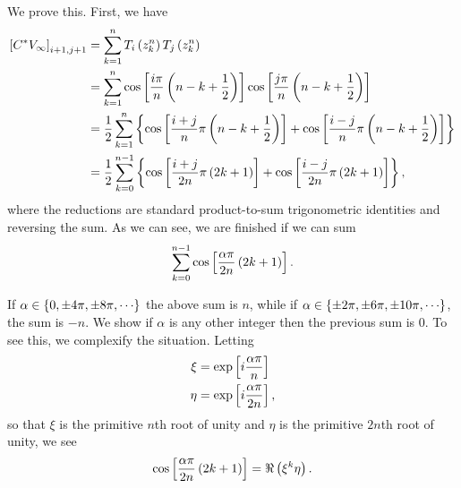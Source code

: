 We prove this.
First, we have
%
\begin{align}
    \left[ C^{*}V_{\infty} \right]_{i+1,j+1}
        &= \sum_{k=1}^{n} T_{i}\left( z_{k}^{n} \right)
        T_{j}\left( z_{k}^{n} \right) \nonumber\\
     &= \sum_{k=1}^{n}
        \cos\left[ \frac{i\pi}{n}\left( n - k + \frac{1}{2} \right) \right]
        \cos\left[ \frac{j\pi}{n}\left( n - k + \frac{1}{2} \right) \right]
        \nonumber \\
     &= \frac{1}{2}\sum_{k=1}^{n}\left\{ 
            \cos\left[ \frac{i + j}{n}\pi\left( n - k + \frac{1}{2} \right) \right]
            + \cos\left[ \frac{i - j}{n}\pi\left( n - k + \frac{1}{2} \right) \right]
         \right\} \nonumber \\
     &= \frac{1}{2}\sum_{k=0}^{n-1}\left\{ 
            \cos\left[ \frac{i + j}{2n}\pi\left( 2k + 1 \right) \right]
            + \cos\left[ \frac{i - j}{2n}\pi\left( 2k + 1 \right) \right]
         \right\},
\end{align}
%
where the reductions are standard product-to-sum trigonometric identities
and reversing the sum. As we can see, we are finished if we can sum
%
\begin{equation}
    \sum_{k=0}^{n-1} \cos\left[ \frac{\alpha\pi}{2n}\left( 2k + 1 \right) \right].
\end{equation}

If $\alpha\in\braces{0,\pm4\pi,\pm8\pi,\cdots}$ the above
sum is $n$, while if $\alpha\in\braces{\pm2\pi,\pm6\pi,\pm10\pi,\cdots}$,
the sum is $-n$. We show if $\alpha$ is any other integer
then the previous sum is $0$.
To see this, we complexify the situation.
Letting
%
\begin{align}
\xi &= \exp\left[ i\frac{\alpha\pi}{n} \right] \nonumber\\
\eta &= \exp\left[ i\frac{\alpha\pi}{2n} \right],
\end{align}
%
so that $\xi$ is the primitive $n$th root of unity and $\eta$ is
the primitive $2n$th root of unity, we see
%
\begin{equation}
\cos\left[ \frac{\alpha\pi}{2n}\left( 2k + 1 \right) \right] = \Re\left( \xi^{k}\eta \right).
\end{equation}

